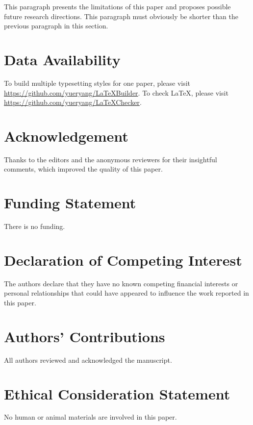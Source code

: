 \documentclass[sigconf]{acmart}
\begin{document}
This paragraph presents the limitations of this paper and proposes possible future research directions. This paragraph must obviously be shorter than the previous paragraph in this section. 

\section*{Data Availability}

To build multiple typesetting styles for one paper, please visit \url{https://github.com/yueryang/LaTeXBuilder}. To check LaTeX, please visit \url{https://github.com/yueryang/LaTeXChecker}. 

\section*{Acknowledgement}

Thanks to the editors and the anonymous reviewers for their insightful comments, which improved the quality of this paper. 

\section*{Funding Statement}

There is no funding. 

\section*{Declaration of Competing Interest}

The authors declare that they have no known competing financial interests or personal relationships that could have appeared to influence the work reported in this paper. 

\section*{Authors' Contributions}

All authors reviewed and acknowledged the manuscript. 

\section*{Ethical Consideration Statement}

No human or animal materials are involved in this paper. 



\end{document}
